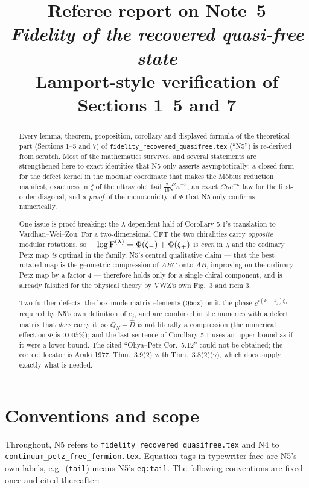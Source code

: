 \documentclass[11pt]{article}
\title{\color{navy}\bfseries Referee report on Note~5\\[.2em]
\large\mdseries\emph{Fidelity of the recovered quasi-free state}\\
Lamport-style verification of Sections 1--5 and 7}
\author{}\date{}
\begin{document}
\maketitle
\vspace{-1.2em}
\begin{abstract}\noindent
Every lemma, theorem, proposition, corollary and displayed formula of the theoretical part
(Sections 1--5 and 7) of \texttt{fidelity\_recovered\_quasifree.tex} (``N5'') is re-derived from
scratch.  Most of the mathematics survives, and several statements are strengthened here to exact
identities that N5 only asserts asymptotically: a closed form for the defect kernel in the modular
coordinate that makes the M\"obius reduction manifest, exactness in $\zeta$ of the ultraviolet
tail $\tfrac2{15}\zeta^2\kappa^{-3}$, an exact $C\kappa e^{-\kappa}$ law for the first-order
diagonal, and a \emph{proof} of the monotonicity of $\Phi$ that N5 only confirms numerically.

One issue is proof-breaking: the $\lambda$-dependent half of Corollary 5.1's translation to
Vardhan--Wei--Zou.  For a two-dimensional CFT the two chiralities carry \emph{opposite} modular
rotations, so $-\log \operatorname{F}^{(\lambda)}=\Phi(\zeta_-)+\Phi(\zeta_+)$ is \emph{even} in $\lambda$ and
the ordinary Petz map \emph{is} optimal in the family.  N5's central qualitative claim --- that the
best rotated map is the geometric compression of $ABC$ onto $AB$, improving on the ordinary Petz
map by a factor $4$ --- therefore holds only for a single chiral component, and is already
falsified for the physical theory by VWZ's own Fig.~3 and item 3.

Two further defects: the box-mode matrix elements (\texttt{Qbox}) omit the phase
$e^{i(k_l-k_j)\xi_0}$ required by N5's own definition of $e_j$, and are combined in the numerics
with a defect matrix that \emph{does} carry it, so $Q_N-\widehat D$ is not literally a compression
(the numerical effect on $\Phi$ is $0.005\%$); and the last sentence of Corollary 5.1 uses an
upper bound as if it were a lower bound.  The cited ``Ohya--Petz Cor.\ 5.12'' could not be
obtained; the correct locator is Araki 1977, Thm.\ 3.9(2) with Thm.\ 3.8(2)($\gamma$), which does
supply exactly what is needed.
\end{abstract}
\tableofcontents
\bigskip

\section*{Conventions and scope}
Throughout, N5 refers to \texttt{fidelity\_recovered\_quasifree.tex} and N4 to
\texttt{continuum\_petz\_free\_fermion.tex}.  Equation tags in typewriter face are N5's own
labels, e.g.\ (\texttt{tail}) means N5's \texttt{eq:tail}.  The following conventions are
fixed once and cited thereafter:
\end{document}
